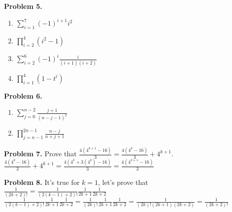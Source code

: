\documentclass[a4paper,12pt]{article}
\newenvironment{problem}[1]{\par\bigskip\noindent\textbf{Problem #1.} \newline}{}
\begin{document}
  \begin{problem}{5}
    \begin{enumerate}
    \item $\sum\limits_{i=1}^{7} (-1)^{i+1} i^2$
    \item $\prod\limits_{i=2}^{4} (i^2 - 1)$
    \item $\sum\limits_{i=2}^{6} (-1)^i \frac{i}{(i+1)(i+2)}$
    \item $\prod\limits_{i=1}^{4} (1-t^i)$
    \end{enumerate}
  \end{problem}

  \begin{problem}{6}
    \begin{enumerate}
    \item $\sum\limits_{j=0}^{n-2} \frac{j+1}{(n-j-1)^2}$
    \item $\prod\limits_{j=n-1}^{2n-1} \frac{n-j}{n+j+1}$
    \end{enumerate}
  \end{problem}

  \begin{problem}{7}
    Prove that $\frac{4(4^{k+1} - 16)}{3} = \frac{4(4^{k}-16)}{3} + 4^{k+1}$.\\
    $\frac{4(4^{k}-16)}{3} + 4^{k+1} = 
    \frac{4(4^{k} + 3(4^{k}) - 16)}{3} = \frac{4(4^{k+1} - 16)}{3}$
  \end{problem}

  \begin{problem}{8}
    It's true for $k=1$, let's prove that
    $\frac1{(2k+2)!} = \frac1{(2(k-1)+2)!} \frac1{2k +1} \frac1{2k + 2}$\\
    $\frac1{(2(k-1)+2)!} \frac1{2k +1} \frac1{2k + 2} =
    \frac1{(2k)!}\frac1{2k+1}\frac1{2k+2}=\frac1{(2k)!(2k+1)(2k+2)}=
    \frac1{(2k+2)!}$
  \end{problem}
\end{document}
